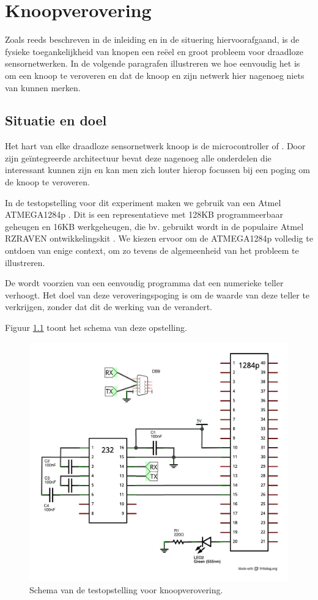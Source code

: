
\chapter{Knoopverovering}
\label{appendix:node-capture}

Zoals reeds beschreven in de inleiding en in de situering hiervoorafgaand, is
de fysieke toegankelijkheid van knopen een re\"eel en groot probleem voor
draadloze sensornetwerken. In de volgende paragrafen illustreren we hoe
eenvoudig het is om een knoop te veroveren en dat de knoop en zijn netwerk hier
nagenoeg niets van kunnen merken.

\section{Situatie en doel}

Het hart van elke draadloze sensornetwerk knoop is de microcontroller of \mcu.
Door zijn ge\"integreerde architectuur bevat deze nagenoeg alle onderdelen die
interessant kunnen zijn en kan men zich louter hierop focussen bij een poging
om de knoop te veroveren.

In de testopstelling voor dit experiment maken we gebruik van een Atmel
ATMEGA1284p \citep{datasheet:atmega1284p}. Dit is een representatieve \mcu met
128KB programmeerbaar geheugen en 16KB werkgeheugen, die bv. gebruikt wordt in
de populaire Atmel RZRAVEN ontwikkelingskit \citep{manual:rzraven}. We kiezen
ervoor om de ATMEGA1284p volledig te ontdoen van enige context, om zo tevens de
algemeenheid van het probleem te illustreren.

De \mcu wordt voorzien van een eenvoudig programma dat een numerieke teller
verhoogt. Het doel van deze veroveringspoging is om de waarde van deze teller
te verkrijgen, zonder dat dit de werking van de \mcu verandert.

Figuur \ref{fig:node-capture-schematic} toont het schema van deze opstelling.

\begin{figure}[ht]
  \centering
  \includegraphics[width=0.7\linewidth]{resources/node-capture-schematic.pdf}
  \caption{Schema van de testopstelling voor knoopverovering.}
  \label{fig:node-capture-schematic}
\end{figure}

